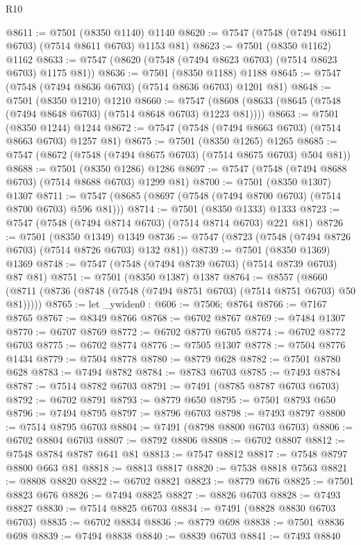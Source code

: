 \begin{lexlean}{R10}
\begin{coremodule}
{{{{{{{{{{{{{{{{{{{{{{{{{{{{{{{{{{{{{{{{{{{{{{{{{{{{{{{{{{{{{{{{{{{{{{{{{{{{{{{{{{{{@8611 := @7501 (@8350 @1140) @1140
@8620 := @7547 (@7548 (@7494 @8611 @6703) (@7514 @8611 @6703) @1153 @81)
@8623 := @7501 (@8350 @1162) @1162
@8633 := @7547 (@8620 (@7548 (@7494 @8623 @6703) (@7514 @8623 @6703) @1175 @81))
@8636 := @7501 (@8350 @1188) @1188
@8645 := @7547 (@7548 (@7494 @8636 @6703) (@7514 @8636 @6703) @1201 @81)
@8648 := @7501 (@8350 @1210) @1210
@8660 := @7547 (@8608 (@8633 (@8645 (@7548 (@7494 @8648 @6703) (@7514 @8648 @6703) @1223 @81))))
@8663 := @7501 (@8350 @1244) @1244
@8672 := @7547 (@7548 (@7494 @8663 @6703) (@7514 @8663 @6703) @1257 @81)
@8675 := @7501 (@8350 @1265) @1265
@8685 := @7547 (@8672 (@7548 (@7494 @8675 @6703) (@7514 @8675 @6703) @504 @81))
@8688 := @7501 (@8350 @1286) @1286
@8697 := @7547 (@7548 (@7494 @8688 @6703) (@7514 @8688 @6703) @1299 @81)
@8700 := @7501 (@8350 @1307) @1307
@8711 := @7547 (@8685 (@8697 (@7548 (@7494 @8700 @6703) (@7514 @8700 @6703) @596 @81)))
@8714 := @7501 (@8350 @1333) @1333
@8723 := @7547 (@7548 (@7494 @8714 @6703) (@7514 @8714 @6703) @221 @81)
@8726 := @7501 (@8350 @1349) @1349
@8736 := @7547 (@8723 (@7548 (@7494 @8726 @6703) (@7514 @8726 @6703) @132 @81))
@8739 := @7501 (@8350 @1369) @1369
@8748 := @7547 (@7548 (@7494 @8739 @6703) (@7514 @8739 @6703) @87 @81)
@8751 := @7501 (@8350 @1387) @1387
@8764 := @8557
    (@8660 (@8711 (@8736 (@8748 (@7548 (@7494 @8751 @6703) (@7514 @8751 @6703) @50 @81)))))
@8765 := let _ywiden0 : @606 := @7506; @8764
@8766 := @7167 @8765
@8767 := @8349 @8766
@8768 := @6702 @8767
@8769 := @7484 @1307
@8770 := @6707 @8769
@8772 := @6702 @8770 @6705
@8774 := @6702 @8772 @6703
@8775 := @6702 @8774
@8776 := @7505 @1307
@8778 := @7504 @8776 @1434
@8779 := @7504 @8778
@8780 := @8779 @628
@8782 := @7501 @8780 @628
@8783 := @7494 @8782
@8784 := @8783 @6703
@8785 := @7493 @8784
@8787 := @7514 @8782 @6703
@8791 := @7491 (@8785 @8787 @6703 @6703)
@8792 := @6702 @8791
@8793 := @8779 @650
@8795 := @7501 @8793 @650
@8796 := @7494 @8795
@8797 := @8796 @6703
@8798 := @7493 @8797
@8800 := @7514 @8795 @6703
@8804 := @7491 (@8798 @8800 @6703 @6703)
@8806 := @6702 @8804 @6703
@8807 := @8792 @8806
@8808 := @6702 @8807
@8812 := @7548 @8784 @8787 @641 @81
@8813 := @7547 @8812
@8817 := @7548 @8797 @8800 @663 @81
@8818 := @8813 @8817
@8820 := @7538 @8818 @7563
@8821 := @8808 @8820
@8822 := @6702 @8821
@8823 := @8779 @676
@8825 := @7501 @8823 @676
@8826 := @7494 @8825
@8827 := @8826 @6703
@8828 := @7493 @8827
@8830 := @7514 @8825 @6703
@8834 := @7491 (@8828 @8830 @6703 @6703)
@8835 := @6702 @8834
@8836 := @8779 @698
@8838 := @7501 @8836 @698
@8839 := @7494 @8838
@8840 := @8839 @6703
@8841 := @7493 @8840
}}}}}}}}}}}}}}}}}}}}}}}}}}}}}}}}}}}}}}}}}}}}}}}}}}}}}}}}}}}}}}}}}}}}}}}}}}}}}}}}}}}}
\end{coremodule}
\end{lexlean}
